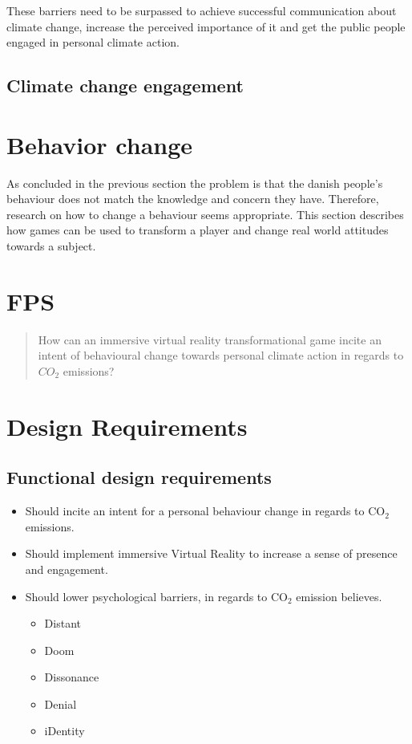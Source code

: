         These barriers need to be surpassed to achieve successful communication about climate change, increase the perceived importance of it and get the public people engaged in personal climate action\cite{the5Ds}.
        
    \subsection{Climate change engagement}
        \cite{reorientingClimageChangeCommunication}\cite{vrEngagementClimateChange}
        
\section{Behavior change}
    As concluded in the previous section the problem is that the danish people's behaviour does not match the knowledge and concern they have. Therefore, research on how to change a behaviour seems appropriate.
    This section describes how games can be used to transform a player and change real world attitudes towards a subject.
    


\section{FPS}\label{sec:FPS}
\begin{quote}
    How can an immersive virtual reality transformational game incite an intent of behavioural change towards personal climate action in regards to $CO_{2}$ emissions? 
\end{quote}

\section{Design Requirements}\label{designReq}

\subsection{Functional design requirements}
\begin{itemize}
    \item Should incite an intent for a personal behaviour change in regards to CO$_2$ emissions.
    \item Should implement immersive Virtual Reality to increase a sense of presence and engagement.
    \item Should lower psychological barriers, in regards to CO$_2$ emission believes.\cite{the5Ds}
    \begin{itemize}
        \item Distant
        \item Doom
        \item Dissonance
        \item Denial
        \item iDentity
    \end{itemize}
\end{itemize}


